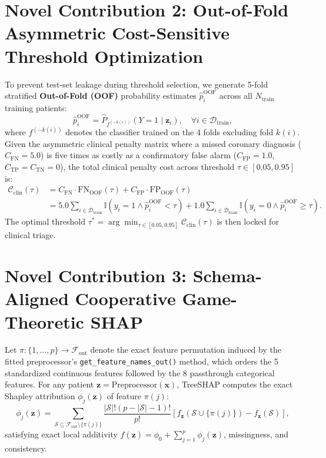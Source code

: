 \documentclass[12pt,a4paper]{report}
\begin{document}
\section{Novel Contribution 2: Out-of-Fold Asymmetric Cost-Sensitive Threshold Optimization}
To prevent test-set leakage during threshold selection, we generate 5-fold stratified \textbf{Out-of-Fold (OOF)} probability estimates $\hat{p}_i^{\text{OOF}}$ across all $N_{\text{train}}$ training patients:
\begin{equation}
    \hat{p}_i^{\text{OOF}} = \hat{P}_{f^{(-k(i))}}(Y=1 \mid \bm{z}_i), \quad \forall i \in \mathcal{D}_{\text{train}},
\end{equation}
where $f^{(-k(i))}$ denotes the classifier trained on the 4 folds excluding fold $k(i)$. Given the asymmetric clinical penalty matrix where a missed coronary diagnosis ($C_{\text{FN}} = 5.0$) is five times as costly as a confirmatory false alarm ($C_{\text{FP}} = 1.0$, $C_{\text{TP}} = C_{\text{TN}} = 0$), the total clinical penalty cost across threshold $\tau \in [0.05, 0.95]$ is:
\begin{align}
    \mathcal{C}_{\text{clin}}(\tau) &= C_{\text{FN}} \cdot \text{FN}_{\text{OOF}}(\tau) + C_{\text{FP}} \cdot \text{FP}_{\text{OOF}}(\tau) \nonumber \\
    &= 5.0 \sum_{i \in \mathcal{D}_{\text{train}}} \mathbb{I}\left(y_i = 1 \wedge \hat{p}_i^{\text{OOF}} < \tau\right) + 1.0 \sum_{i \in \mathcal{D}_{\text{train}}} \mathbb{I}\left(y_i = 0 \wedge \hat{p}_i^{\text{OOF}} \ge \tau\right).
\end{align}
The optimal threshold $\tau^* = \arg\min_{\tau \in [0.05, 0.95]} \mathcal{C}_{\text{clin}}(\tau)$ is then locked for clinical triage.

\section{Novel Contribution 3: Schema-Aligned Cooperative Game-Theoretic SHAP}
Let $\pi : \{1, \dots, p\} \to \mathcal{F}_{\text{out}}$ denote the exact feature permutation induced by the fitted preprocessor's \texttt{get\_feature\_names\_out()} method, which orders the 5 standardized continuous features followed by the 8 passthrough categorical features. For any patient $\bm{z} = \text{Preprocessor}(\bm{x})$, TreeSHAP \cite{lundberg2017unified,shapley1953value} computes the exact Shapley attribution $\phi_j(\bm{z})$ of feature $\pi(j)$:
\begin{equation}
    \phi_j(\bm{z}) = \sum_{\mathcal{S} \subseteq \mathcal{F}_{\text{out}} \setminus \{\pi(j)\}} \frac{|\mathcal{S}|! (p - |\mathcal{S}| - 1)!}{p!} \left[ f_{\bm{z}}\left(\mathcal{S} \cup \{\pi(j)\}\right) - f_{\bm{z}}(\mathcal{S}) \right],
\end{equation}
satisfying exact local additivity $f(\bm{z}) = \phi_0 + \sum_{j=1}^p \phi_j(\bm{z})$, missingness, and consistency.
\end{document}
